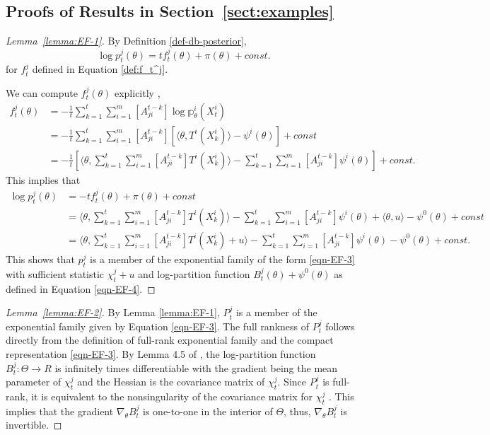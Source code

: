 \documentclass[twoside,11pt]{article}
\numberwithin{equation}{section}
\newcommand\bp{\mathbb{p}}
\begin{document}
{\subsection{Proofs of Results in Section~\ref{sect:examples}} \label{app:examples}
\begin{proof}[Lemma~\ref{lemma:EF-1}]
   By Definition \eqref{def-db-posterior}, 
   \begin{equation*}
    \log p_t^j(\theta) = t f_t^j(\theta)+ \pi(\theta) + const. 
   \end{equation*}
   for $f_t^j$ defined in Equation \eqref{def:f_t^j}. 
   
   We can compute $f_t^j(\theta)$ explicitly , 
   \begin{align*}
       f_t^j(\theta) &= -\frac{1}{t} \sum_{k = 1}^t \sum_{i = 1}^m [A^{t-k}_{ji}] \log \bp_\theta^i(X_t^i) \\
       &=  -\frac{1}{t} \sum_{k = 1}^t \sum_{i = 1}^m [A^{t-k}_{ji}] \left[ \langle \theta, T^i(X_k^i) \rangle - \psi^i(\theta)  \right] + const  \\
       &= -\frac{1}{t}\left[ \langle \theta,  \sum_{k = 1}^t \sum_{i = 1}^m [A^{t-k}_{ji}]  T^i(X_k^i) \rangle -  \sum_{k = 1}^t \sum_{i = 1}^m [A^{t-k}_{ji}]  \psi^i(\theta)  \right] + const. 
   \end{align*}
   This implies that
   \begin{align*}
        \log p_t^j(\theta) &= -t f_t^j(\theta)+ \pi(\theta)  + const \\
        &=  \langle \theta,   \sum_{k = 1}^t \sum_{i = 1}^m [A^{t-k}_{ji}]  T^i(X_k^i) \rangle - \sum_{k = 1}^t \sum_{i = 1}^m [A^{t-k}_{ji}]  \psi^i(\theta)   + \langle \theta, u\rangle - \psi^0(\theta) + const\\
        &=  \langle \theta,   \sum_{k = 1}^t \sum_{i = 1}^m [A^{t-k}_{ji}]  T^i(X_k^i) + u\rangle -  \sum_{k = 1}^t \sum_{i = 1}^m [A^{t-k}_{ji}]  \psi^i(\theta) - \psi^0(\theta) + const. 
   \end{align*}
   This shows that $p_t^j$ is a member of the exponential family of the form \eqref{eqn-EF-3} with sufficient statistic $\chi_t^j + u$ and log-partition function $ B_t^j(\theta)  + \psi^0(\theta)$ as defined in Equation \eqref{eqn-EF-4}. 
\end{proof}
\begin{proof}[Lemma~\ref{lemma:EF-2}]
By Lemma \ref{lemma:EF-1}, $P_t^j$ is a member of the exponential family given by Equation \eqref{eqn-EF-3}. 
    The full rankness of $P_t^j$ follows directly from the definition of full-rank exponential family and the compact representation \eqref{eqn-EF-3}. By Lemma 4.5 of \cite{VanderVaart2000}, the log-partition function $B_t^j: \Theta \to R$ is infinitely times differentiable with the gradient being the mean parameter of $\chi_t^j$ and the Hessian is the covariance matrix of $\chi_t^j$. Since $P_t^j$ is full-rank, it is equivalent to the nonsingularity of the covariance matrix for $\chi_t^j$ \cite{VanderVaart2000}. This implies that the gradient $\nabla_\theta B_t^j$ is one-to-one in the interior of $\Theta$, thus, $\nabla_\theta B_t^j$ is invertible. 

\end{proof}}
\end{document}

